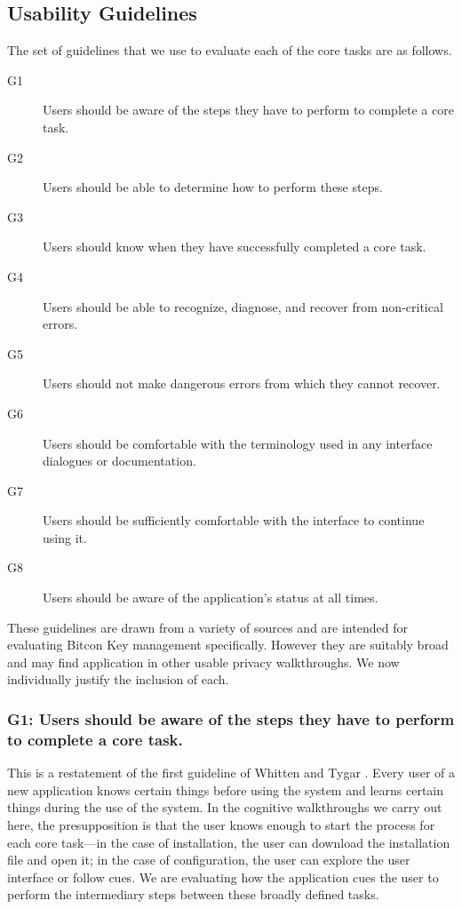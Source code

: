 
\subsection{Usability Guidelines} %

	The set of guidelines that we use to evaluate each of the core tasks are as follows.
	
\begin{description}
	\item[G1] Users should be aware of the steps they have to perform to complete a core task.
	\item[G2] Users should be able to determine how to perform these steps.
	\item[G3] Users should know when they have successfully completed a core task.
	\item[G4] Users should be able to recognize, diagnose, and recover from non-critical errors.
	\item[G5] Users should not make dangerous errors from which they cannot recover.
	\item[G6] Users should be comfortable with the terminology used in any interface dialogues or documentation.
	\item[G7] Users should be sufficiently comfortable with the interface to continue using it.
	\item[G8] Users should be aware of the application's status at all times.
\end{description}

	These guidelines are drawn from a variety of sources \cite{cw,johnny,karat,p3p,pvo,clark} and are intended for evaluating Bitcon Key management specifically. However they are suitably broad and may find application in other usable privacy walkthroughs. We now individually justify the inclusion of each.
	


\subsubsection*{G1: Users should be aware of the steps they have to perform to complete a core task.} This is a restatement of the first guideline of Whitten and Tygar \cite{johnny}. Every user of a new application knows certain things before using the system and learns certain things during the use of the system. In the cognitive walkthroughs we carry out here, the presupposition is that the user knows enough to start the process for each core task---in the case of installation, the user can download the installation file and open it; in the case of configuration, the user can explore the user interface or follow cues. We are evaluating how the application cues the user to perform the intermediary steps between these broadly defined tasks. 
	
